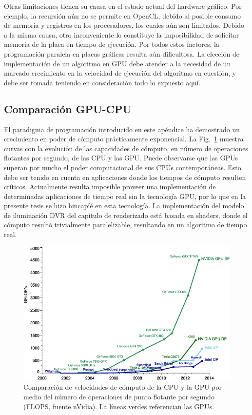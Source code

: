 Otras limitaciones tienen su causa en el estado actual del hardware gráfico.
Por ejemplo, la recursión aún no se permite en OpenCL, debido al posible consumo de memoria y registros en los procesadores, los cuales aún son limitados.
Debido a la misma causa, otro inconveniente lo constituye la imposibilidad de solicitar memoria de la placa en tiempo de ejecución.
Por todos estos factores, la programación paralela en placas gráficas resulta aún dificultosa.
La elección de implementación de un algoritmo en GPU debe atender a la necesidad de un marcado crecimiento en la velocidad de ejecución del algoritmo en cuestión, y debe ser tomada teniendo en consideración todo lo expuesto aquí.

\subsection{Comparación GPU-CPU}
El paradigma de programación introducido en este apéndice ha demostrado un crecimiento en poder de cómputo prácticamente exponencial.
La Fig.~\ref{fg:cpugpu} muestra curvas con la evolución de las capacidades de cómputo, en número de operaciones flotantes por segundo, de las CPU y las GPU.
Puede observarse que las GPUs superan por mucho el poder computacional de sus CPUs contemporáneas.
Esto debe ser tenido en cuenta en aplicaciones donde los tiempos de cómputo resulten críticos.
Actualmente resulta imposible proveer una implementación de determinadas aplicaciones de tiempo real sin la tecnología GPU, por lo que en la presente tesis se hizo hincapíé en esta tecnología.
La implementación del modelo de iluminación DVR del capítulo de renderizado está basada en shaders, donde el cómputo resultó trivialmente paralelizable, resultando en un algoritmo de tiempo real.

\begin{figure}[h]
\begin{center}
\includegraphics[width=12cm]{figures/cpugpu}
\end{center}
\caption[Comparación de velocidades de cómputo de la CPU y la GPU]{Comparación de velocidades de cómputo de la CPU y la GPU por medio del número de operaciones de punto flotante por segundo (FLOPS, fuente nVidia). La líneas verdes referencian las GPUs.}
\label{fg:cpugpu}
\end{figure}



